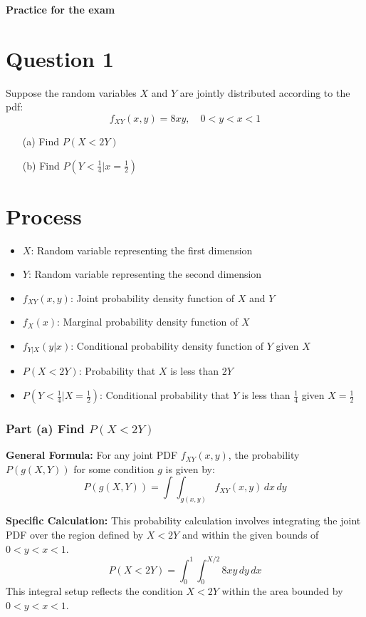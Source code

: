 \documentclass[12pt]{article}
\begin{document}
\begin{center}
  \Large \textbf{Practice for the exam}
\end{center}

\section*{Question 1}
Suppose the random variables \(X\) and \(Y\) are jointly distributed according to the pdf:
\[ f_{XY}(x,y) = 8xy, \quad 0 < y < x < 1 \]
\begin{itemize}
  \item[(a)] Find \( P(X < 2Y) \)
  \item[(b)] Find \( P(Y < \frac{1}{4} |  x = \frac{1}{2}) \)
\end{itemize}


\section*{Process}
\begin{itemize}
  \item \( X \): Random variable representing the first dimension
  \item \( Y \): Random variable representing the second dimension
  \item \( f_{XY}(x, y) \): Joint probability density function of \( X \) and \( Y \)
  \item \( f_X(x) \): Marginal probability density function of \( X \)
  \item \( f_{Y|X}(y|x) \): Conditional probability density function of \( Y \) given \( X \)
  \item \( P(X < 2Y) \): Probability that \( X \) is less than \( 2Y \)
  \item \( P(Y < \frac{1}{4} | X = \frac{1}{2}) \): Conditional probability that \( Y \) is less than \( \frac{1}{4} \) given \( X = \frac{1}{2} \)
\end{itemize}
\subsubsection*{Part (a) Find \( P(X < 2Y) \)}
\textbf{General Formula:}
For any joint PDF \( f_{XY}(x, y) \), the probability \( P(g(X, Y)) \) for some condition \( g \) is given by:
\[ P(g(X, Y)) = \int \int_{g(x, y)} f_{XY}(x, y) \, dx \, dy \]

\textbf{Specific Calculation:}
This probability calculation involves integrating the joint PDF over the region defined by \( X < 2Y \) and within the given bounds of \( 0 < y < x < 1 \).
\[
  P(X < 2Y) = \int_0^1 \int_0^{X/2} 8xy \, dy \, dx
\]
This integral setup reflects the condition \( X < 2Y \) within the area bounded by \( 0 < y < x < 1 \).
\end{document}
